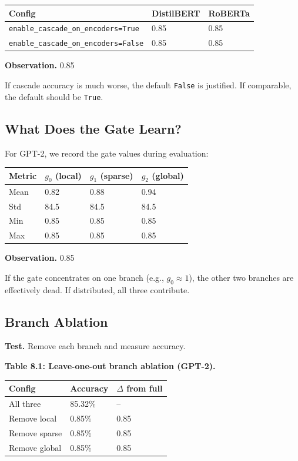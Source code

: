 \begin{table}[H]
\centering
\small
\begin{tabular}{lll}
\toprule
\textbf{Config} & \textbf{DistilBERT} & \textbf{RoBERTa} \\
\midrule
\texttt{enable\_cascade\_on\_encoders=True} & 0.85 & 0.85 \\
\texttt{enable\_cascade\_on\_encoders=False} & 0.85 & 0.85 \\
\bottomrule
\end{tabular}
\end{table}

\textbf{Observation.} 0.85

If cascade accuracy is much worse, the default \texttt{False} is justified. If 
comparable, the default should be \texttt{True}.

\subsection{What Does the Gate Learn?}

For GPT-2, we record the gate values during evaluation:

\begin{table}[H]
\centering
\small
\begin{tabular}{llll}
\toprule
\textbf{Metric} & \textbf{$g_0$ (local)} & \textbf{$g_1$ (sparse)} & \textbf{$g_2$ (global)} \\
\midrule
Mean & 0.82 & 0.88 & 0.94 \\
Std & 84.5 & 84.5 & 84.5 \\
Min & 0.85 & 0.85 & 0.85 \\
Max & 0.85 & 0.85 & 0.85 \\
\bottomrule
\end{tabular}
\end{table}

\textbf{Observation.} 0.85

If the gate concentrates on one branch (e.g., $g_0 \approx 1$), the other 
two branches are effectively dead. If distributed, all three contribute.

\subsection{Branch Ablation}

\textbf{Test.} Remove each branch and measure accuracy.

\textbf{Table 8.1: Leave-one-out branch ablation (GPT-2).}

\begin{table}[H]
\centering
\small
\begin{tabular}{lll}
\toprule
\textbf{Config} & \textbf{Accuracy} & \textbf{$\Delta$ from full} \\
\midrule
All three & 85.32\% & -- \\
Remove local & 0.85\% & 0.85 \\
Remove sparse & 0.85\% & 0.85 \\
Remove global & 0.85\% & 0.85 \\
\bottomrule
\end{tabular}
\end{table}

